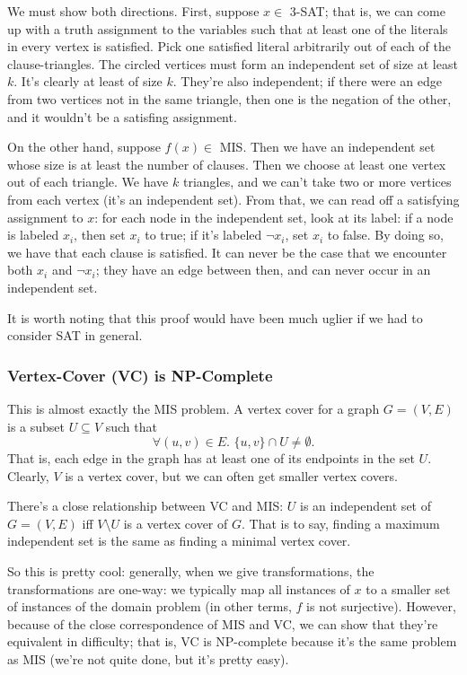 \documentclass{article}
\begin{document}
We must show both directions.
First, suppose $x\in $ 3-SAT; that is, we can come up with a truth assignment
to the variables such that at least one of the literals in every vertex
is satisfied. Pick one satisfied literal  arbitrarily out of each of the
clause-triangles. The circled vertices must form an independent set of size
at least $k$. It's clearly at least of size $k$. They're also independent; if
there were an edge from two vertices not in the same triangle, then one
is the negation of the other, and it wouldn't be a satisfing assignment.

On the other hand, suppose $f(x)\in$ MIS. Then we have an independent set
whose size is at least the number of clauses. Then we choose at least one
vertex out of each triangle. We have $k$ triangles, and we can't take
two or more vertices from each vertex (it's an independent set).
From that, we can read off a satisfying assignment to $x$: for each node in
the independent set, look at its label: if a node is labeled $x_i$, then 
set $x_i$ to true; if it's labeled $\neg x_i$, set $x_i$ to false. By
doing so, we have that each clause is satisfied. It can never be the
case that we encounter both $x_i$ and $\neg x_i$; they have an edge between
then, and can never occur in an independent set.

It is worth noting that this proof would have been much uglier if we had
to consider SAT in general.



\subsubsection{Vertex-Cover (VC) is NP-Complete}

This is almost exactly the MIS problem. A vertex cover for a graph $G=(V,E)$
is a subset $U\subseteq V$ such that
$$
\forall(u,v)\in E.\,\,
\{u,v\} \cap U \neq \emptyset.
$$
That is, each edge in the graph has at least one of its endpoints in the set
$U$.
Clearly, $V$ is a vertex cover, but we can often get smaller vertex covers.

There's a close relationship between VC and MIS: $U$ is an independent set
of $G=(V,E)$ iff $V\setminus U$ is a vertex cover of $G$.
That is to say, finding a maximum independent set is the same as finding
a minimal vertex cover.

So this is pretty cool: generally, when we give transformations, the 
transformations are one-way: we typically map all instances of $x$ to a smaller
set of instances of the domain problem (in other terms, $f$ is not surjective).
However, because of the close correspondence of MIS and VC, we can show that
they're equivalent in difficulty; that is, VC is NP-complete because it's the
same problem as MIS (we're not quite done, but it's pretty easy).
\end{document}
